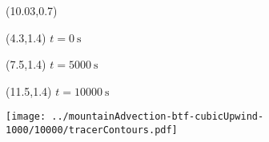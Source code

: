 \documentclass{article}
\begin{document}
\TPMargin{1pt}
\begin{textblock}{0.75}(10.03,0.7)
\end{textblock}
\begin{textblock}{4}(4.3,1.4)
\normalsize
$t = \SI{0}{\second}$
\end{textblock}
\begin{textblock}{4}(7.5,1.4)
\normalsize
$t = \SI{5000}{\second}$
\end{textblock}
\begin{textblock}{4}(11.5,1.4)
\normalsize
$t = \SI{10000}{\second}$
\end{textblock}
\centering
\texttt{[image: ../mountainAdvection-btf-cubicUpwind-1000/10000/tracerContours.pdf]}
\end{document}
